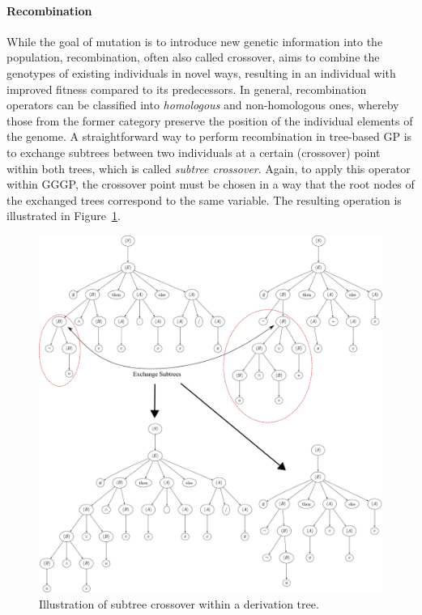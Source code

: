 \paragraph{Recombination}
While the goal of mutation is to introduce new genetic information into the population, recombination, often also called crossover, aims to combine the genotypes of existing individuals in novel ways, resulting in an individual with improved fitness compared to its predecessors.
In general, recombination operators can be classified into \emph{homologous} and non-homologous ones, whereby those from the former category preserve the position of the individual elements of the genome.
A straightforward way to perform recombination in tree-based GP is to exchange subtrees between two individuals at a certain (crossover) point within both trees, which is called \emph{subtree crossover}.
Again, to apply this operator within GGGP, the crossover point must be chosen in a way that the root nodes of the exchanged trees correspond to the same variable.
The resulting operation is illustrated in Figure~\ref{fig:gp-subtree-crossover}.  
\begin{figure}
	\centering
	\includegraphics[scale=0.5]{figures/trees/subtree_crossover.pdf}
	\caption{Illustration of subtree crossover within a derivation tree.}
	\label{fig:gp-subtree-crossover}
\end{figure}
